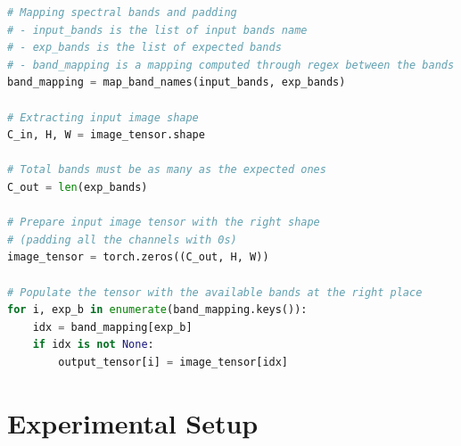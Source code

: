 \documentclass[a4paper, oneside, english]{sapthesis} %
\begin{document}
\vspace{0.5cm}

\begin{lstlisting}[language=Python, caption={Pseudocode for reordering the multispectral bands of input images and padding with zeroes the missing ones.}, label={lst:bandmapping}]
# Mapping spectral bands and padding
# - input_bands is the list of input bands name
# - exp_bands is the list of expected bands
# - band_mapping is a mapping computed through regex between the bands sets,
band_mapping = map_band_names(input_bands, exp_bands)

# Extracting input image shape
C_in, H, W = image_tensor.shape

# Total bands must be as many as the expected ones
C_out = len(exp_bands)

# Prepare input image tensor with the right shape
# (padding all the channels with 0s)
image_tensor = torch.zeros((C_out, H, W))

# Populate the tensor with the available bands at the right place
for i, exp_b in enumerate(band_mapping.keys()):
    idx = band_mapping[exp_b]
    if idx is not None:
        output_tensor[i] = image_tensor[idx]
\end{lstlisting}



\chapter{Experimental Setup} %
\end{document}
